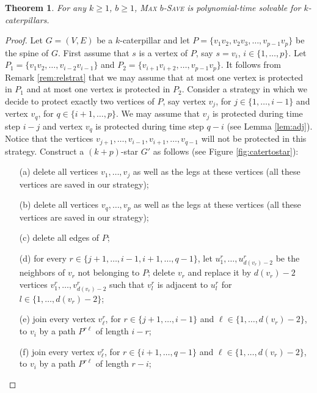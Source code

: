 \documentclass[10pt]{article}
\newcommand{\probtitle}[1]{\textsc{#1}}
\newtheorem{theorem}{Theorem}
\begin{document}
\begin{theorem}
\label{th:maxbssave_kcater}
For any $k \geq 1$, $b \geq 1$, \probtitle{Max $b$-Save} is polynomial-time solvable for $k$-caterpillars.
\end{theorem}

\begin{proof}
Let $G=(V,E)$ be a $k$-caterpillar and let $P=\{v_1v_2,v_2v_3,\ldots,v_{p-1}v_p\}$ be the spine of $G$. First assume that $s$ is a vertex of $P$, say $s=v_i$, $i\in \{1,\ldots,p\}$. Let $P_1=\{v_1v_2,\ldots,v_{i-2}v_{i-1}\}$ and $P_2=\{v_{i+1}v_{i+2},\ldots,v_{p-1}v_p\}$. It follows from Remark \ref{rem:relstrat} that we may assume that at most one vertex is protected in $P_1$ and at most one vertex is protected in $P_2$. Consider a strategy in which we decide to protect exactly two vertices of $P$, say vertex $v_j$, for $j\in\{1,\ldots,i-1\}$ and vertex $v_q$, for $q\in \{i+1,\ldots,p\}$. We may assume that $v_j$ is protected during time step $i-j$ and vertex $v_q$ is protected during time step $q-i$ (see Lemma \ref{lem:adj}). Notice that the vertices $v_{j+1},\ldots,v_{i-1},v_{i+1},\ldots,v_{q-1}$ will not be protected in this strategy. Construct a $(k+p)$-star $G'$ as follows (see Figure \ref{fig:catertostar}):

\begin{itemize}
\item[(a)] delete all vertices $v_1,\ldots,v_j$ as well as the legs at these vertices (all these vertices are saved in our strategy);
\item[(b)] delete all vertices $v_q,\ldots,v_p$ as well as the legs at these vertices (all these vertices are saved in our strategy);
\item[(c)] delete all edges of $P$;
\item[(d)] for every $r\in \{j+1,\ldots,i-1,i+1,\ldots,q-1\}$, let $u_1^r,\ldots,u_{d(v_r)-2}^r$ be the neighbors of $v_r$ not belonging to $P$; delete $v_r$ and replace it by $d(v_r)-2$ vertices $v_{1}^{r},\ldots,v_{d(v_r)-2}^{r}$ such that $v_{l}^{r}$ is adjacent to $u_l^r$ for $l\in \{1,\ldots,d(v_r)-2\}$;
\item[(e)] join every vertex $v_{\ell}^{r}$, for $r\in \{j+1,\ldots,i-1\}$ and $\ell\in \{1,\ldots,d(v_r)-2\}$, to $v_i$ by a path $P^{r\ell}$ of length $i-r$;
\item[(f)] join every vertex $v_{\ell}^{r}$, for $r\in \{i+1,\ldots,q-1\}$ and $\ell\in \{1,\ldots,d(v_r)-2\}$, to $v_i$ by a path $P^{r\ell}$ of length $r-i$;
\end{itemize}


\end{proof}
\end{document}
